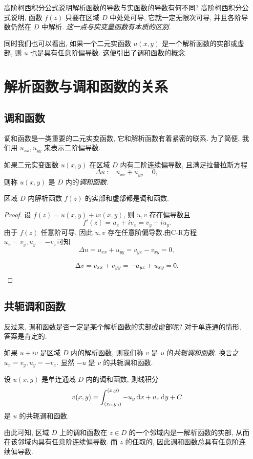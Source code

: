 \documentclass[nocolor,theme=doremi,lang=cn,11pt,chinese,twoside,openright,usesamecnt]{elegantbook}
\begin{document}
高阶柯西积分公式说明解析函数的导数与实函数的导数有何不同?
高阶柯西积分公式说明, 函数 $f(z)$ 只要在区域 $D$ 中处处可导, 它就一定无限次可导, 并且各阶导数仍然在 $D$ 中解析.
\emph{这一点与实变量函数有本质的区别.}

同时我们也可以看出, 如果一个二元实函数 $u(x,y)$ 是一个解析函数的实部或虚部, 则 $u$ 也是具有任意阶偏导数.
这便引出了调和函数的概念.

\section{解析函数与调和函数的关系}

\subsection{调和函数}

调和函数是一类重要的二元实变函数, 它和解析函数有着紧密的联系.
为了简便, 我们用 $u_{xx},u_{yy}$ 来表示二阶偏导数.

\begin{definition}
	如果二元实变函数 $u(x,y)$ 在区域 $D$ 内有二阶连续偏导数, 且满足拉普拉斯方程
	\[\Delta u:=u_{xx}+u_{yy}=0,\]
	则称 $u(x,y)$ 是 $D$ 内的\emph{调和函数}.
\end{definition}

\begin{theorem}
	区域 $D$ 内解析函数 $f(z)$ 的实部和虚部都是调和函数.
\end{theorem}

\begin{proof}
	设 $f(z)=u(x,y)+iv(x,y)$, 则 $u,v$ 存在偏导数且
		\[f'(z)=u_x+iv_x=v_y-iu_y.\]
	{由于 $f(z)$ 任意阶可导, 因此 $u,v$ 存在任意阶偏导数.由C-R方程 $u_x=v_y,u_y=-v_x$可知
		\[\Delta u=u_{xx}+u_{yy}=v_{yx}-v_{xy}=0,\]}

	{
		\[\Delta v=v_{xx}+v_{yy}=-u_{yx}+u_{xy}=0.\qedhere\]}
\end{proof}

\subsection{共轭调和函数}

反过来, 调和函数是否一定是某个解析函数的实部或虚部呢?
对于单连通的情形, 答案是肯定的.

如果 $u+iv$ 是区域 $D$ 内的解析函数, 则我们称 $v$ 是 $u$ 的\emph{共轭调和函数}.
换言之 $u_x=v_y,u_y=-v_x$.
显然 $-u$ 是 $v$ 的共轭调和函数.
\begin{theorem}
	设 $u(x,y)$ 是单连通域 $D$ 内的调和函数, 则线积分
	\[v(x,y)=\int_{(x_0,y_0)}^{(x,y)}-u_y\,\mathrm{d} x+u_x\,\mathrm{d} y+C\]
	是 $u$ 的共轭调和函数.
\end{theorem}
由此可知, 区域 $D$ 上的调和函数在 $z\in D$ 的一个邻域内是一解析函数的实部, 从而在该邻域内具有任意阶连续偏导数.
而 $z$ 的任取的, 因此调和函数总具有任意阶连续偏导数.
\end{document}
